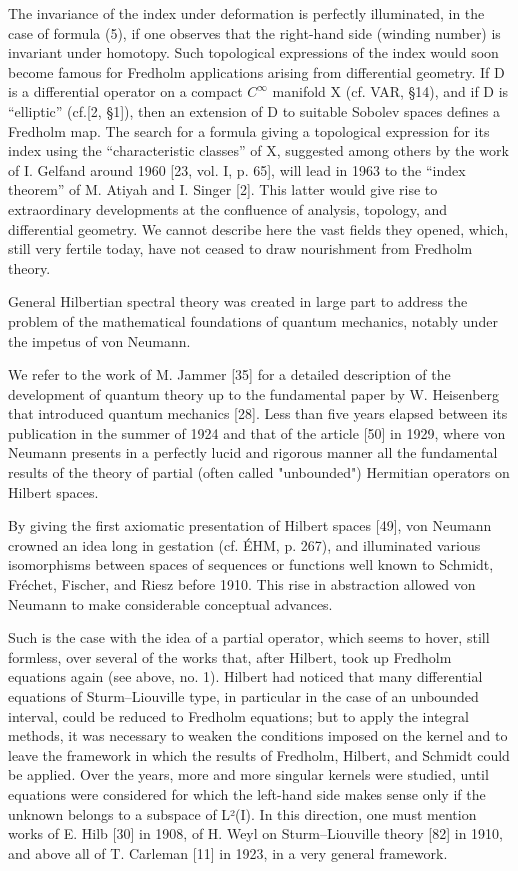 The invariance of the index under deformation is perfectly illuminated, in the case of formula (5), if one observes that the right-hand side (winding number) is invariant under homotopy. Such topological expressions of the index would soon become famous for Fredholm applications arising from differential geometry. If D is a differential operator on a compact \(C^{\infty}\) manifold X (cf. VAR, §14), and if D is “elliptic” (cf.{[}2, §1{]}), then an extension of D to suitable Sobolev spaces defines a Fredholm map. The search for a formula giving a topological expression for its index using the “characteristic classes” of X, suggested among others by the work of I. Gelfand around 1960 {[}23, vol. I, p. 65{]}, will lead in 1963 to the “index theorem” of M. Atiyah and I. Singer {[}2{]}. This latter would give rise to extraordinary developments at the confluence of analysis, topology, and differential geometry. We cannot describe here the vast fields they opened, which, still very fertile today, have not ceased to draw nourishment from Fredholm theory.


General Hilbertian spectral theory was created in large part to address the problem of the mathematical foundations of quantum mechanics, notably under the impetus of von Neumann.

We refer to the work of M. Jammer {[}35{]} for a detailed description of the development of quantum theory up to the fundamental paper by W. Heisenberg that introduced quantum mechanics {[}28{]}. Less than five years elapsed between its publication in the summer of 1924 and that of the article {[}50{]} in 1929, where von Neumann presents in a perfectly lucid and rigorous manner all the fundamental results of the theory of partial (often called "unbounded") Hermitian operators on Hilbert spaces.

By giving the first axiomatic presentation of Hilbert spaces {[}49{]}, von Neumann crowned an idea long in gestation (cf. ÉHM, p. 267), and illuminated various isomorphisms between spaces of sequences or functions well known to Schmidt, Fréchet, Fischer, and Riesz before 1910. This rise in abstraction allowed von Neumann to make considerable conceptual advances.

Such is the case with the idea of a partial operator, which seems to hover, still formless, over several of the works that, after Hilbert, took up Fredholm equations again (see above, no. 1). Hilbert had noticed that many differential equations of Sturm--Liouville type, in particular in the case of an unbounded interval, could be reduced to Fredholm equations; but to apply the integral methods, it was necessary to weaken the conditions imposed on the kernel and to leave the framework in which the results of Fredholm, Hilbert, and Schmidt could be applied. Over the years, more and more singular kernels were studied, until equations were considered for which the left-hand side makes sense only if the unknown belongs to a subspace of L²(I). In this direction, one must mention works of E. Hilb {[}30{]} in 1908, of H. Weyl on Sturm--Liouville theory {[}82{]} in 1910, and above all of T. Carleman {[}11{]} in 1923, in a very general framework.

